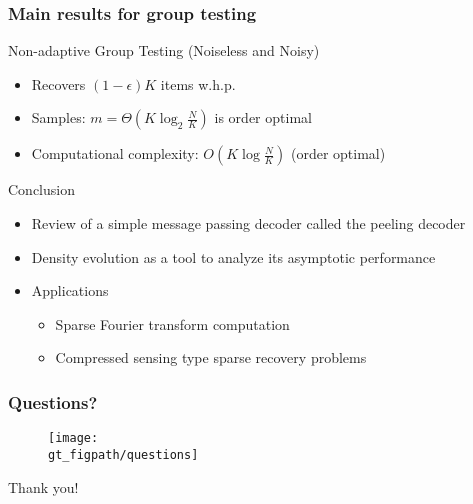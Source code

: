 \begin{frame} \frametitle{Main results for group testing}
\begin{block}{Non-adaptive Group Testing (Noiseless and Noisy)}
\begin{itemize}
\item Recovers $(1-\epsilon)K$ items w.h.p.
\item Samples: $m = \Theta(K \log_2 \frac{N}{K})$ is order optimal
\item Computational complexity: $O(K \log \frac{N}{K})$  (order optimal)
\end{itemize}
\end{block}

\end{frame}

\begin{frame}{Conclusion}
\begin{itemize}
  \item Review of a simple message passing decoder called the peeling decoder
  \item Density evolution as a tool to analyze its asymptotic performance
  \item Applications 
    \begin{itemize}
      \item Sparse Fourier transform computation
      \item Compressed sensing type sparse recovery problems
    \end{itemize}
\end{itemize}
\end{frame}
	
\begin{frame}\frametitle{Questions?}
	\begin{figure}[t]
		\centering
		\texttt{[image: \\gt\_figpath/questions]}
	\end{figure}
	\centering
	\color{blue}
	\Huge{Thank you!}
\end{frame}
